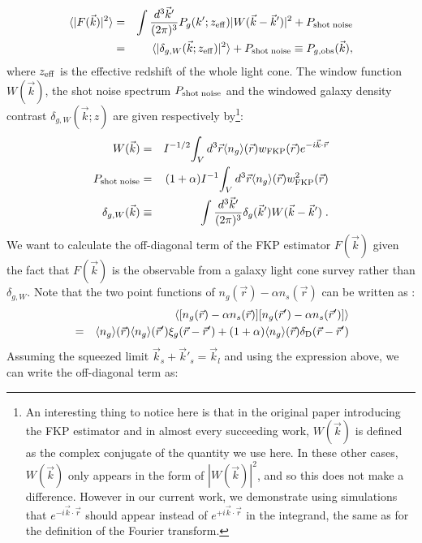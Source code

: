 \documentclass[prd,amsmath,amssymb,floatfix,superscriptaddress,nofootinbib,twocolumn]{revtex4-1}
\newcommand{\vs}{\nonumber\\}
\newcommand{\vk}{\vec{k}}
\newcommand{\eql}[1]{\label{eq:#1}}
\begin{document}
\begin{eqnarray}
\langle |F(\vec{k})|^{2}\rangle &=&\int \frac{d^{3}\vec{k}'}{(2\pi)^3}P_{g}(k';z_{\rm eff})|W(\vec{k}-\vec{k}')|^2+P_{\rm shot \; noise}\nonumber\\
&=&\langle |\delta_{g,W}(\vec{k};z_{\rm eff})|^2 \rangle+P_{\rm shot \; noise}\equiv P_{g,\rm obs}(\vec{k}),
\end{eqnarray}
where $z_{\rm eff}$ is the effective redshift of the whole light cone. The window function $W(\vk)$, the shot noise spectrum $P_{\rm shot \; noise}$ and the windowed galaxy density contrast $\delta_{g,W}(\vk;z)$ are given respectively by\footnote{An interesting thing to notice here is that in the original paper introducing the FKP estimator \cite{Feldman:1993ky} and in almost every
  succeeding work, $W(\vk)$ is defined as the complex conjugate of the quantity we use here. In these other cases, $W(\vk)$ only appears in the form of $|W(\vk)|^2$, and  so this does not make a difference. However in our current work, we demonstrate using simulations that  $e^{-i\vec{k}\cdot \vec{r}}$ should appear instead of $e^{+i\vec{k}\cdot \vec{r}}$ in the integrand, the same as for the definition of the Fourier transform.}:
\begin{eqnarray}
W(\vec{k})&= &I^{-1/2}{\int_{V} d^{3}\vec{r} \langle n_{g}\rangle(\vec{r})w_{\rm FKP}(\vec{r})e^{-i\vec{k}\cdot \vec{r}}  }\eql{WinF}\\
P_{\rm shot \; noise}&=&(1+\alpha)I^{-1}{\int_{V}d^{3}\vec{r} \langle n_{g}\rangle (\vec{r}) w_{\rm FKP}^{2}(\vec{r})}\\
\delta_{g,W}(\vec{k})&\equiv& \int \frac{d^{3}\vec{k}'}{(2\pi)^3} \delta_{g}(\vec{k}')W(\vec{k}-\vec{k}')\eql{WinD}\;.
\end{eqnarray}
We want to calculate the off-diagonal term of the FKP estimator $F(\vk)$ given the fact that $F(\vk)$ is the observable from a galaxy light cone survey rather than $\delta_{g,W}$. Note that the two point functions of $n_{g}(\vec{r})-\alpha n_{s}(\vec{r})$ can be written as \cite{Feldman:1993ky}:
\begin{eqnarray}
&&\langle [n_{g}(\vec{r})-\alpha n_{s}(\vec{r})][n_{g}(\vec{r}')-\alpha n_{s}(\vec{r}')]\rangle\nonumber\\
&=&\langle n_{g}\rangle(\vec{r})\langle n_{g}\rangle(\vec{r}')\xi_{g}(\vec{r}-\vec{r}')+(1+\alpha)\langle n_{g}\rangle(\vec{r})\delta_{\rm D}(\vec{r}-\vec{r}')\vs
\end{eqnarray}
Assuming the squeezed limit $\vec{k}_s+\vec{k}'_s=\vec{k}_l$ and using the expression above, we can write the off-diagonal term as:
\end{document}
